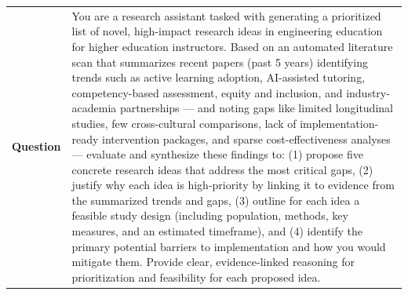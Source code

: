 \begin{longtable}{@{}l p{12.5cm}@{}}
  \textbf{Question} & You are a research assistant tasked with generating a prioritized list of novel, high-impact research ideas in engineering education for higher education instructors. Based on an automated literature scan that summarizes recent papers (past 5 years) identifying trends such as active learning adoption, AI-assisted tutoring, competency-based assessment, equity and inclusion, and industry-academia partnerships --- and noting gaps like limited longitudinal studies, few cross-cultural comparisons, lack of implementation-ready intervention packages, and sparse cost-effectiveness analyses --- evaluate and synthesize these findings to: (1) propose five concrete research ideas that address the most critical gaps, (2) justify why each idea is high-priority by linking it to evidence from the summarized trends and gaps, (3) outline for each idea a feasible study design (including population, methods, key measures, and an estimated timeframe), and (4) identify the primary potential barriers to implementation and how you would mitigate them. Provide clear, evidence-linked reasoning for prioritization and feasibility for each proposed idea. \\

\end{longtable}
